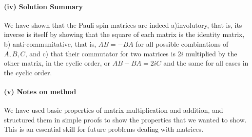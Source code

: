 \documentclass{article}
\begin{document}
\paragraph{(iv) Solution Summary} We have shown that the Pauli spin matrices are indeed a)involutory, that is, its inverse is itself by showing that the square of each matrix is the identity matrix, b) anti-communitative, that is, $AB = -BA$ for all possible combinations of $A,B,C$, and c) that their commutator for two matrices is $2i$ multiplied by the other matrix, in the cyclic order, or $AB - BA = 2iC$ and the same for all cases in the cyclic order.

\paragraph{(v) Notes on method} We have used basic properties of matrix multiplication and addition, and structured them in simple proofs to show the properties that we wanted to show. This is an essential skill for future problems dealing with matrices.
\end{document}
